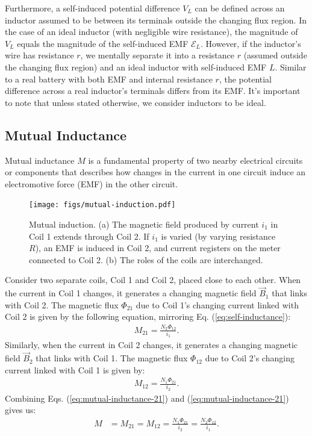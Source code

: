 \documentclass[12pt,b4paper]{article}
\begin{document}
Furthermore, a self-induced potential difference $V_L$ can be defined across an inductor assumed to be between its terminals outside the changing flux region. In the case of an ideal inductor (with negligible wire resistance), the magnitude of $V_L$ equals the magnitude of the self-induced EMF $\mathcal{E}_L$. However, if the inductor's wire has resistance $r$, we mentally separate it into a resistance $r$ (assumed outside the changing flux region) and an ideal inductor with self-induced EMF $L$. Similar to a real battery with both EMF and internal resistance $r$, the potential difference across a real inductor's terminals differs from its EMF. It's important to note that unless stated otherwise, we consider inductors to be ideal.
\subsection{Mutual Inductance}
Mutual inductance $M$ is a fundamental property of two nearby electrical circuits or components that describes how changes in the current in one circuit induce an electromotive force (EMF) in the other circuit.
\begin{figure}[H]
    \centering
    \texttt{[image: figs/mutual-induction.pdf]}
    \caption{Mutual induction. (a) The magnetic field produced by current $i_1$ in Coil 1 extends through Coil 2. If $i_1$ is varied (by varying resistance $R$), an EMF is induced in Coil 2, and current registers on the meter connected to Coil 2. (b) The roles of the coils are interchanged.}
    \label{fig:mutual-inductance}
\end{figure}
Consider two separate coils, Coil 1 and Coil 2, placed close to each other. When the current in Coil 1 changes, it generates a changing magnetic field $\vec{B}_1$ that links with Coil 2. The magnetic flux $\Phi_{21}$ due to Coil 1's changing current linked with Coil 2 is given by the following equation, mirroring Eq. (\ref{eq:self-inductance}):
\begin{align}
    M_{21}=\frac{N_2\Phi_{12}}{i_1}.\label{eq:mutual-inductance-21}
\end{align}
Similarly, when the current in Coil 2 changes, it generates a changing magnetic field $\vec{B}_2$ that links with Coil 1. The magnetic flux $\Phi_{12}$ due to Coil 2's changing current linked with Coil 1 is given by:
\begin{align}
    M_{12}=\frac{N_1\Phi_{21}}{i_2}.\label{eq:mutual-inductance-12}
\end{align}
Combining Eqs. (\ref{eq:mutual-inductance-21}) and (\ref{eq:mutual-inductance-21}) gives us:
\begin{align}
    M&=M_{21}=M_{12}=\frac{N_1\Phi_{21}}{i_2}=\frac{N_2\Phi_{12}}{i_1}.
\end{align}
\end{document}
